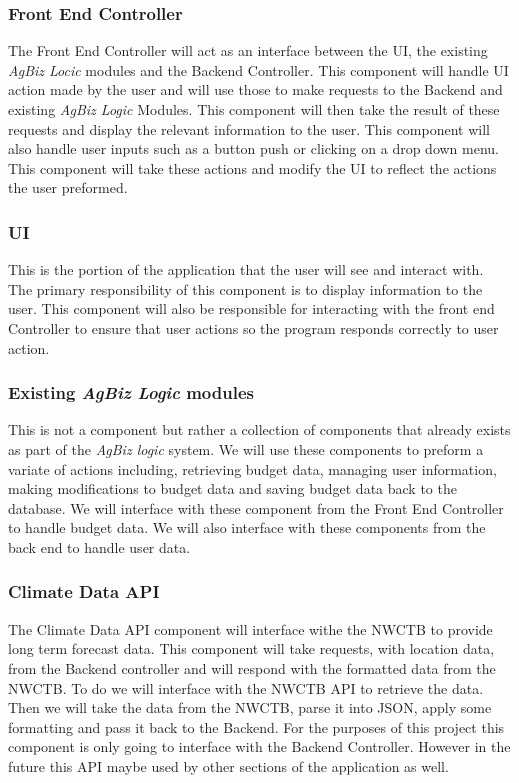 \documentclass[onecolumn, draftclsnofoot,10pt, compsoc]{article}
\begin{document}
		\subsubsection{Front End Controller}
			The Front End Controller will act as an interface between the UI, the existing \textit{AgBiz Locic} modules and the Backend Controller. This component will handle UI action made by the user and will use those to make requests to the Backend and existing \textit{AgBiz Logic} Modules. This component will then take the result of these requests and display the relevant information to the user. This component will also handle user inputs such as a button push or clicking on a drop down menu. This component will take these actions and modify the UI to reflect the actions the user preformed.\\

		\subsubsection{UI}
			This is the portion of the application that the user will see and interact with. The primary responsibility of this component is to display information to the user. This component will also be responsible for interacting with the front end Controller to ensure that user actions so the program responds correctly to user action.\\
			
		\subsubsection{Existing \textit{AgBiz Logic} modules}
			This is not a component but rather a collection of components that already exists as part of the \textit{AgBiz logic} system. We will use these components to preform a variate of actions including, retrieving budget data, managing user information, making modifications to budget data and saving budget data back to the database. We will interface with these component from the Front End Controller to handle budget data. We will also interface with these components from the back end to handle user data.\\
			
			
		\subsubsection{Climate Data API}
			The Climate Data API component will interface withe the NWCTB to provide long term forecast data. This component will take requests, with location data, from the Backend controller and will respond with the formatted data from the NWCTB. To do we will interface with the NWCTB API to retrieve the data. Then we will take the data from the NWCTB, parse it into JSON, apply some formatting and pass it back to the Backend. For the purposes of this project this component is only going to interface with the Backend Controller. However in the future this API maybe used by other sections of the application as well.\\
\end{document}
